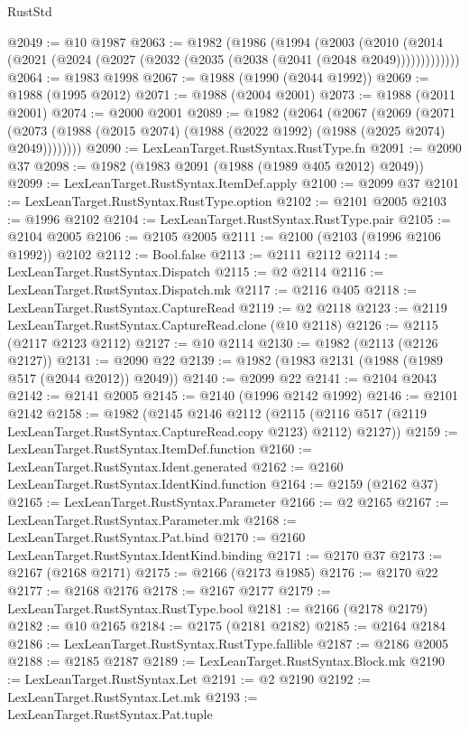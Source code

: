 \begin{lexlean}{RustStd}
\begin{coremodule}
@2049 := @10 @1987
@2063 := @1982
    (@1986
      (@1994
        (@2003
          (@2010 (@2014 (@2021 (@2024 (@2027 (@2032 (@2035 (@2038 (@2041 (@2048 @2049)))))))))))))
@2064 := @1983 @1998
@2067 := @1988 (@1990 (@2044 @1992))
@2069 := @1988 (@1995 @2012)
@2071 := @1988 (@2004 @2001)
@2073 := @1988 (@2011 @2001)
@2074 := @2000 @2001
@2089 := @1982
    (@2064
      (@2067
        (@2069
          (@2071 (@2073 (@1988 (@2015 @2074) (@1988 (@2022 @1992) (@1988 (@2025 @2074) @2049))))))))
@2090 := LexLeanTarget.RustSyntax.RustType.fn
@2091 := @2090 @37
@2098 := @1982 (@1983 @2091 (@1988 (@1989 @405 @2012) @2049))
@2099 := LexLeanTarget.RustSyntax.ItemDef.apply
@2100 := @2099 @37
@2101 := LexLeanTarget.RustSyntax.RustType.option
@2102 := @2101 @2005
@2103 := @1996 @2102
@2104 := LexLeanTarget.RustSyntax.RustType.pair
@2105 := @2104 @2005
@2106 := @2105 @2005
@2111 := @2100 (@2103 (@1996 @2106 @1992)) @2102
@2112 := Bool.false
@2113 := @2111 @2112
@2114 := LexLeanTarget.RustSyntax.Dispatch
@2115 := @2 @2114
@2116 := LexLeanTarget.RustSyntax.Dispatch.mk
@2117 := @2116 @405
@2118 := LexLeanTarget.RustSyntax.CaptureRead
@2119 := @2 @2118
@2123 := @2119 LexLeanTarget.RustSyntax.CaptureRead.clone (@10 @2118)
@2126 := @2115 (@2117 @2123 @2112)
@2127 := @10 @2114
@2130 := @1982 (@2113 (@2126 @2127))
@2131 := @2090 @22
@2139 := @1982 (@1983 @2131 (@1988 (@1989 @517 (@2044 @2012)) @2049))
@2140 := @2099 @22
@2141 := @2104 @2043
@2142 := @2141 @2005
@2145 := @2140 (@1996 @2142 @1992)
@2146 := @2101 @2142
@2158 := @1982
    (@2145
      @2146
      @2112
      (@2115 (@2116 @517 (@2119 LexLeanTarget.RustSyntax.CaptureRead.copy @2123) @2112) @2127))
@2159 := LexLeanTarget.RustSyntax.ItemDef.function
@2160 := LexLeanTarget.RustSyntax.Ident.generated
@2162 := @2160 LexLeanTarget.RustSyntax.IdentKind.function
@2164 := @2159 (@2162 @37)
@2165 := LexLeanTarget.RustSyntax.Parameter
@2166 := @2 @2165
@2167 := LexLeanTarget.RustSyntax.Parameter.mk
@2168 := LexLeanTarget.RustSyntax.Pat.bind
@2170 := @2160 LexLeanTarget.RustSyntax.IdentKind.binding
@2171 := @2170 @37
@2173 := @2167 (@2168 @2171)
@2175 := @2166 (@2173 @1985)
@2176 := @2170 @22
@2177 := @2168 @2176
@2178 := @2167 @2177
@2179 := LexLeanTarget.RustSyntax.RustType.bool
@2181 := @2166 (@2178 @2179)
@2182 := @10 @2165
@2184 := @2175 (@2181 @2182)
@2185 := @2164 @2184
@2186 := LexLeanTarget.RustSyntax.RustType.fallible
@2187 := @2186 @2005
@2188 := @2185 @2187
@2189 := LexLeanTarget.RustSyntax.Block.mk
@2190 := LexLeanTarget.RustSyntax.Let
@2191 := @2 @2190
@2192 := LexLeanTarget.RustSyntax.Let.mk
@2193 := LexLeanTarget.RustSyntax.Pat.tuple

\end{coremodule}
\end{lexlean}
